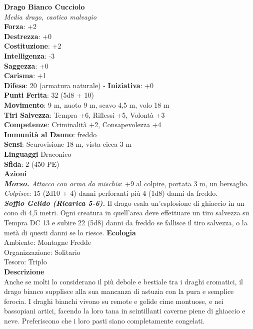 \begin{multicols}{2}
\medskip\textbf{Drago Bianco Cucciolo}\\
\emph{Media drago, caotico malvagio}\\
\textbf{Forza}: +2\\
\textbf{Destrezza}: +0\\
\textbf{Costituzione}: +2\\
\textbf{Intelligenza}: -3\\
\textbf{Saggezza}: +0\\
\textbf{Carisma}: +1\\
\textbf{Difesa}: 20 (armatura naturale) - \textbf{Iniziativa}: +0\\
\textbf{Punti Ferita}: 32 (5d8 + 10)\\
\textbf{Movimento}: 9 m, nuoto 9 m, scavo 4,5 m, volo 18 m\\
\textbf{Tiri Salvezza}: Tempra +6, Riflessi +5, Volontà +3\\
\textbf{Competenze}: Criminalità +2, Consapevolezza +4\\
\textbf{Immunità al Danno}: freddo\\
\textbf{Sensi}: Scurovisione 18 m, vista cieca 3 m\\
\textbf{Linguaggi} Draconico\\
\textbf{Sfida}: 2 (450 PE)\smallskip\\
\smallskip\textbf{Azioni}\\
\emph{\textbf{Morso.} Attacco con arma da mischia}: +9 al colpire, portata 3 m, un bersaglio.\\
\emph{Colpisce:} 15 (2d10 + 4) danni perforanti più 4 (1d8) danni da freddo.\\
\emph{\textbf{Soffio Gelido (Ricarica 5-6).}} Il drago esala un'esplosione di ghiaccio in un cono di 4,5 metri. Ogni creatura in quell'area deve effettuare un tiro salvezza su Tempra DC  13 e subire 22 (5d8) danni da freddo se fallisce il tiro salvezza, o la metà di questi danni se lo riesce.
\textbf{Ecologia}\\
Ambiente: Montagne Fredde\\
Organizzazione: Solitario\\
Tesoro: Triplo\\
\textbf{Descrizione}\\
Anche se molti lo considerano il più debole e bestiale tra i draghi cromatici, il drago bianco supplisce alla sua mancanza di astuzia con la pura e semplice ferocia. I draghi bianchi vivono su remote e gelide cime montuose, e nei bassopiani artici, facendo la loro tana in scintillanti caverne piene di ghiaccio e neve. Preferiscono che i loro pasti siano completamente congelati.\\



\end{multicols}
